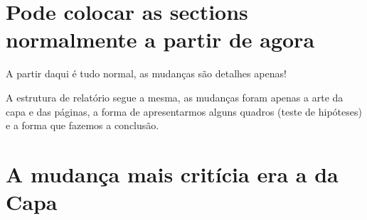 \documentclass[a4paper, 12pt]{article} %
\begin{document}
\section{Pode colocar as sections normalmente a partir de agora}

A partir daqui é tudo normal, as mudanças são detalhes apenas!

A estrutura de relatório segue a mesma, as mudanças foram apenas a arte da capa e das páginas, a forma de apresentarmos alguns quadros (teste de hipóteses) e a forma que fazemos a conclusão.

\section{A mudança mais critícia era a da Capa}
\end{document}
